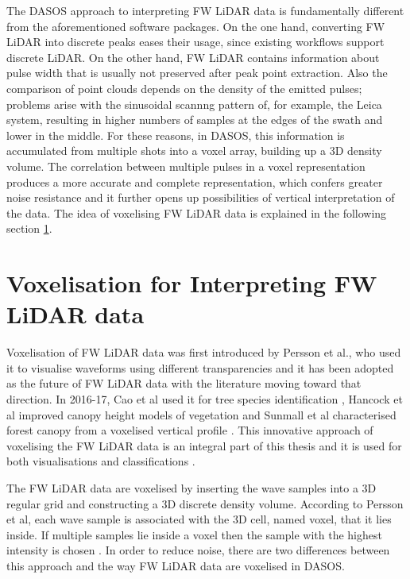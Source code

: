 \documentclass{subfiles}
\begin{document}
	\par The DASOS approach to interpreting FW LiDAR data is fundamentally different from the aforementioned software packages. On the one hand, converting FW LiDAR into discrete peaks eases their usage, since existing workflows support discrete LiDAR.  On the other hand, FW LiDAR contains information about pulse width that is usually not preserved after peak point extraction. Also the comparison of point clouds depends on the density of the emitted pulses; problems arise with the sinusoidal scannng pattern of, for example, the Leica system, resulting in higher numbers of samples at the edges of the swath and lower in the middle. For these reasons, in DASOS, this information is accumulated from multiple shots into a voxel array, building up a 3D density volume. The correlation between multiple pulses in a voxel representation produces a more accurate and complete representation, which confers greater noise resistance and it further opens up possibilities of vertical interpretation of the data. The idea of voxelising FW LiDAR data is explained in the following section \ref{Voxelisation}.  
	
		
	 \section{Voxelisation for Interpreting FW LiDAR data}\label{Voxelisation}
		
	\par Voxelisation of FW LiDAR data was first introduced by Persson et al., who used it to visualise waveforms using different transparencies \cite{Persson2005} and it has been adopted as the future of FW LiDAR data with the literature moving toward that direction. In 2016-17, Cao et al used it for tree species identification \cite{Cao2016}, Hancock et al improved canopy height models of vegetation \cite{Hancock2017}  and Sunmall et al characterised forest canopy from a voxelised vertical profile \cite{Sumnall2016}. This innovative approach of voxelising the FW LiDAR data is an integral part of this thesis and it is used for both visualisations and classifications \cite{Miltiadou2014}\cite{Miltiadou2015}. 

	\par The FW LiDAR data are voxelised by inserting the wave samples into a 3D regular grid and constructing a 3D discrete density volume. According to Persson et al, each wave sample is associated with the 3D cell, named voxel, that it lies inside. If multiple samples lie inside a voxel then the sample with the highest intensity is chosen \cite{Persson2005}. In order to reduce noise, there are two differences between this approach and the way FW LiDAR data are voxelised in DASOS.
	
\end{document}
